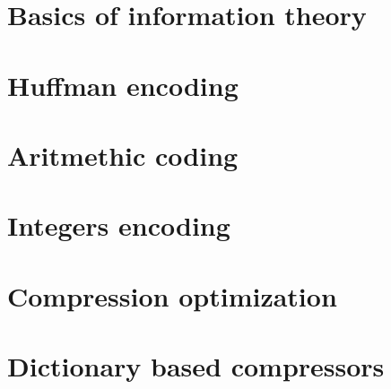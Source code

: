 \documentclass[moon, colormath]{lectures2}
\begin{document}

    \section{Basics of information theory} 
    

    \section{Huffman encoding}
    

    \section{Aritmethic coding}
    

    \section{Integers encoding}
    

    \section{Compression optimization}
    

    \section{Dictionary based compressors}
    
    \clearpage\printbibliography
    \clearpage\printglossaries
\end{document}
